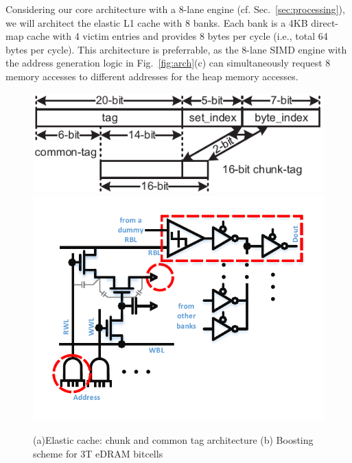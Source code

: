 Considering our core architecture with a 8-lane engine (cf. Sec.~\ref{sec:processing}), 
we will architect the elastic L1 cache with 8 banks. 
Each bank is a 4KB direct-map cache with 4 victim entries and provides 8 bytes per cycle (i.e., total 64 bytes per cycle).
This architecture is preferrable, as the 8-lane SIMD engine with the address generation logic in Fig.~\ref{fig:arch}(c) can simultaneously request 8 memory accesses to different addresses for the heap memory accesses.

\begin{figure}
\center
\includegraphics[width=0.4\linewidth]{./fig/chunk_tag_16bit-eps-converted-to.pdf}
\includegraphics[width=0.3\linewidth]{./fig/boosting.pdf}
\caption{(a)Elastic cache: chunk and common tag architecture (b) Boosting scheme for 3T eDRAM bitcells}
\label{fig:elastic-cache}
\end{figure}


